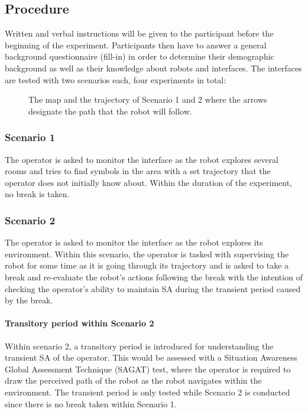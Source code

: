 \documentclass[conference]{IEEEtran}
\begin{document}
\subsection{ Procedure} Written and verbal instructions will be given to the participant before the beginning of the experiment. Participants then have to answer a general background questionnaire (fill-in) in order to determine their demographic background as well as their knowledge about robots and interfaces. The interfaces are tested with two scenarios each, four experiments in total:

\begin{figure}[h]

\caption{The map and the trajectory of Scenario 1 and 2 where the arrows designate the path that the robot will follow.}
\centering
\end{figure}


\subsubsection{Scenario 1} 

The operator is asked to monitor the interface as the robot explores several rooms  and tries to find symbols in the area with a set trajectory that the operator does not initially know about. Within the duration of the experiment, no break is taken. 

\subsubsection{Scenario 2}The operator is asked to monitor the interface as the robot explores its environment. Within this scenario, the operator is tasked with supervising the robot for some time as it is going through its trajectory and is asked to take a break and re-evaluate the robot's actions following the break  with the intention of checking the operator's ability to maintain SA during the transient period caused by the break.

\paragraph {Transitory period within Scenario 2}
Within scenario 2, a transitory period is introduced for understanding the transient SA of the operator. This would be assessed with a Situation Awareness Global Assessment Technique (SAGAT) test, where the operator is required to draw the perceived path of the robot as the robot navigates within the environment. The transient period is only tested while Scenario 2 is conducted since there is no break taken within Scenario 1. 
\end{document}
